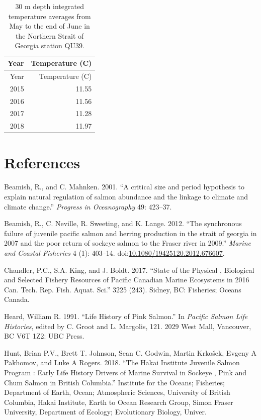 \documentclass[fleqn,10pt]{wlpeerj} %
\begin{document}
\begin{longtable}[]{@{}rr@{}}
\caption{\label{tab:ssttable} 30 m depth integrated temperature averages
from May to the end of June in the Northern Strait of Georgia station
QU39.}\tabularnewline
\toprule
Year & Temperature (C)\tabularnewline
\midrule
\endfirsthead
\toprule
Year & Temperature (C)\tabularnewline
\midrule
\endhead
2015 & 11.55\tabularnewline
2016 & 11.56\tabularnewline
2017 & 11.28\tabularnewline
2018 & 11.97\tabularnewline
\bottomrule
\end{longtable}

\section*{References}\label{references}

\hypertarget{refs}{}
\hypertarget{ref-Beamish2001}{}
Beamish, R., and C. Mahnken. 2001. ``A critical size and period
hypothesis to explain natural regulation of salmon abundance and the
linkage to climate and climate change.'' \emph{Progress in Oceanography}
49: 423--37.

\hypertarget{ref-Beamish2012}{}
Beamish, R., C. Neville, R. Sweeting, and K. Lange. 2012. ``The
synchronous failure of juvenile pacific salmon and herring production in
the strait of georgia in 2007 and the poor return of sockeye salmon to
the Fraser river in 2009.'' \emph{Marine and Coastal Fisheries} 4 (1):
403--14.
doi:\href{https://doi.org/10.1080/19425120.2012.676607}{10.1080/19425120.2012.676607}.

\hypertarget{ref-Chandler2017}{}
Chandler, P.C., S.A. King, and J. Boldt. 2017. ``State of the Physical ,
Biological and Selected Fishery Resources of Pacific Canadian Marine
Ecosystems in 2016 Can. Tech. Rep. Fish. Aquat. Sci.'' 3225 (243).
Sidney, BC: Fisheries; Oceans Canada.

\hypertarget{ref-Heard1991}{}
Heard, William R. 1991. ``Life History of Pink Salmon.'' In
\emph{Pacific Salmon Life Histories}, edited by C. Groot and L.
Margolis, 121. 2029 West Mall, Vancouver, BC V6T 1Z2: UBC Press.

\hypertarget{ref-Hunt2018}{}
Hunt, Brian P.V., Brett T. Johnson, Sean C. Godwin, Martin Krkošek,
Evgeny A Pakhomov, and Luke A Rogers. 2018. ``The Hakai Institute
Juvenile Salmon Program : Early Life History Drivers of Marine Survival
in Sockeye , Pink and Chum Salmon in British Columbia.'' Institute for
the Oceans; Fisheries; Department of Earth, Ocean; Atmospheric Sciences,
University of British Columbia, Hakai Institute, Earth to Ocean Research
Group, Simon Fraser University, Department of Ecology; Evolutionary
Biology, Univer.
\end{document}
